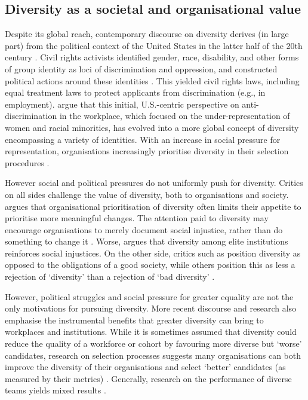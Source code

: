\subsection{Diversity as a societal and organisational value}\label{ssec:value}
Despite its global reach, contemporary discourse on diversity derives (in large part) from the political context of the United States in the latter half of the 20th century \cite{nkomo2019diversity}. Civil rights activists identified gender, race, disability, and other forms of group identity as loci of discrimination and oppression, and constructed political actions around these identities \cite{morris1984origins}. This yielded civil rights laws, including equal treatment laws to protect applicants from discrimination (e.g., in employment). \textcite{nkomo2019diversity} argue that this initial, U.S.-centric perspective on anti-discrimination in the workplace, which focused on the under-representation of women and racial minorities, has evolved into a more global concept of diversity encompassing a variety of identities. With an increase in social pressure for representation, organisations increasingly prioritise diversity in their selection procedures \cite{hsieh2019allocation,minkin2023diversity}.

However social and political pressures do not uniformly push for diversity. Critics on all sides challenge the value of diversity, both to organisations and society. \textcite{Ahmed_2012} argues that organisational prioritisation of diversity often limits their appetite to prioritise more meaningful changes. The attention paid to diversity may encourage organisations to merely document social injustice, rather than do something to change it \cite{Ahmed_2012,Rossi2020-ROSWNA-2}. Worse, \textcite{Warikoo_2019} argues that diversity among elite institutions reinforces social injustices. On the other side, critics such as \textcite{Goodhart} position diversity as opposed to the obligations of a good society, while others position this as less a rejection of `diversity' than a rejection of `bad diversity' \cite{lentin_Multiculturalism_2011}.

However, political struggles and social pressure for greater equality are not the only motivations for pursuing diversity. More recent discourse and research also emphasise the instrumental benefits that greater diversity can bring to workplaces and institutions. While it is sometimes assumed that diversity could reduce the quality of a workforce or cohort by favouring more diverse but `worse' candidates, research on selection processes suggests many organisations can both improve the diversity of their organisations and select `better' candidates (as measured by their metrics) \cite{autor2008does,noray2023systemic}. Generally, research on the performance of diverse teams yields mixed results \cite{daubner2017dovetailing,page_diversity_2017,noray2023systemic,muller_learning_2019}.

